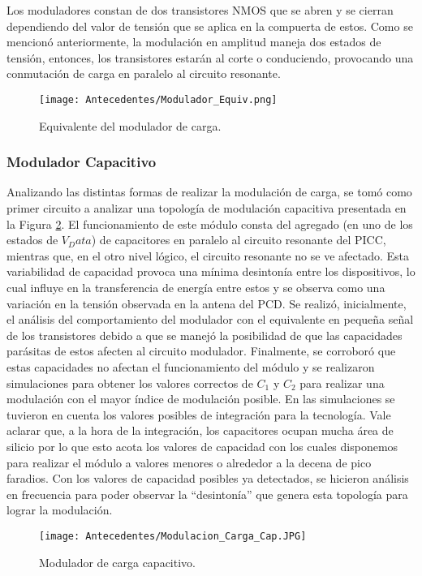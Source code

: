 Los moduladores constan de dos transistores
NMOS que se abren y se cierran dependiendo
del valor de tensión que se aplica en la compuerta
de estos. Como se mencionó anteriormente,
la modulación en amplitud maneja dos
estados de tensión, entonces, los transistores
estarán al corte o conduciendo, provocando
una conmutación de carga en paralelo al circuito
resonante.

\begin{figure}[H]
\centering
\texttt{[image: Antecedentes/Modulador\_Equiv.png]}
\caption{Equivalente del modulador de carga.}
\label{fig:Mod_equ}
\end{figure}

\subsubsection{Modulador Capacitivo}
Analizando las distintas formas de realizar la
modulación de carga, se tomó como primer
circuito a analizar una topología de modulación
capacitiva presentada en la Figura \ref{fig:Mod_carg_cap}. El
funcionamiento de este módulo consta del
agregado (en uno de los estados de $V_Data$) de
capacitores en paralelo al circuito resonante
del PICC, mientras que, en el otro nivel lógico,
el circuito resonante no se ve afectado. Esta
variabilidad de capacidad provoca una mínima
desintonía entre los dispositivos, lo cual influye
en la transferencia de energía entre estos y se
observa como una variación en la tensión observada
en la antena del PCD.
Se realizó, inicialmente, el análisis del comportamiento
del modulador con el equivalente
en pequeña señal de los transistores debido a
que se manejó la posibilidad de que las capacidades
parásitas de estos afecten al circuito
modulador. Finalmente, se corroboró que estas
capacidades no afectan el funcionamiento
del módulo y se realizaron simulaciones para
obtener los valores correctos de $C_1$ y $C_2$ para
realizar una modulación con el mayor índice
de modulación posible. En las simulaciones se
tuvieron en cuenta los valores posibles de integración
para la tecnología. Vale aclarar que, 
a la hora de la integración, los capacitores
ocupan mucha área de silicio por lo que esto
acota los valores de capacidad con los cuales
disponemos para realizar el módulo a valores
menores o alrededor a la decena de pico faradios.
Con los valores de capacidad posibles ya
detectados, se hicieron análisis en frecuencia
para poder observar la “desintonía” que genera
esta topología para lograr la modulación.

\begin{figure}[H]
\centering
\texttt{[image: Antecedentes/Modulacion\_Carga\_Cap.JPG]}
\caption{Modulador de carga capacitivo.}
\label{fig:Mod_carg_cap}
\end{figure}

